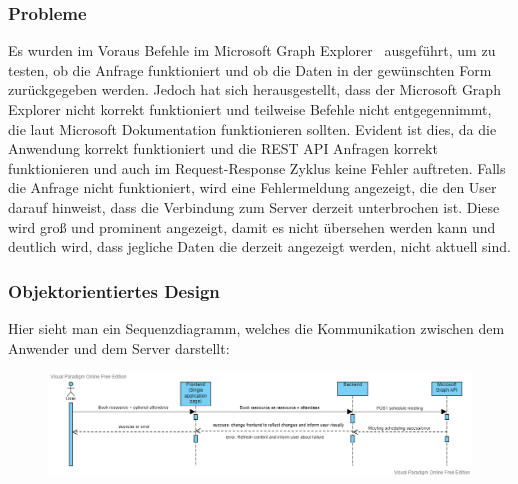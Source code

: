 \subsubsection{Probleme}\label{subsubsec:probleme}
Es wurden im Voraus Befehle im Microsoft Graph Explorer~\cite{Microsoft-Graph-Explorer} ausgeführt, um zu testen, ob die Anfrage funktioniert und ob die Daten in der gewünschten Form zurückgegeben werden.
Jedoch hat sich herausgestellt, dass der Microsoft Graph Explorer nicht korrekt funktioniert und teilweise Befehle nicht entgegennimmt, die laut Microsoft Dokumentation funktionieren sollten.
Evident ist dies, da die Anwendung korrekt funktioniert und die REST API Anfragen korrekt funktionieren und auch im Request-Response Zyklus keine Fehler auftreten.
\newline
\newline
Falls die Anfrage nicht funktioniert, wird eine Fehlermeldung angezeigt, die den User darauf hinweist, dass die Verbindung zum Server derzeit unterbrochen ist.
Diese wird groß und prominent angezeigt, damit es nicht übersehen werden kann und deutlich wird, dass jegliche Daten die derzeit angezeigt werden, nicht aktuell sind.
\newline
\newline
\subsubsection{Objektorientiertes Design}
Hier sieht man ein Sequenzdiagramm, welches die Kommunikation zwischen dem Anwender und dem Server darstellt:
\newline
\newline
\par\vspace{0.5cm}
\begin{figure}[h]
\centering
\includegraphics[width=\textwidth]{Bilder/Objektorientiertes Design/Sequence diagram for ressource booking (3)}
\par\vspace{0.5cm}\label{fig:figure}
\end{figure}
\justifying
\newline
\newline

